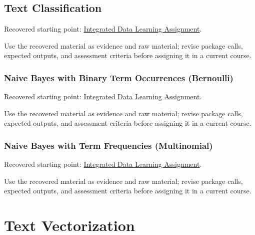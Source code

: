 \documentclass[
  letterpaper,
]{scrbook}
\begin{document}
\section*{Text Classification}\label{sec-pr-11-text-classification}


Recovered starting point:
\hyperref[sec-lab-integrated-learning-assignment]{Integrated Data
Learning Assignment}.

Use the recovered material as evidence and raw material; revise package
calls, expected outputs, and assessment criteria before assigning it in
a current course.

\subsection*{Naive Bayes with Binary Term Occurrences
(Bernoulli)}\label{sec-pr-11-naive-bayes-with-binary-term-occurrences-bernoulli}

Recovered starting point:
\hyperref[sec-lab-integrated-learning-assignment]{Integrated Data
Learning Assignment}.

Use the recovered material as evidence and raw material; revise package
calls, expected outputs, and assessment criteria before assigning it in
a current course.

\subsection*{Naive Bayes with Term Frequencies
(Multinomial)}\label{sec-pr-11-naive-bayes-with-term-frequencies-multinomial}

Recovered starting point:
\hyperref[sec-lab-integrated-learning-assignment]{Integrated Data
Learning Assignment}.

Use the recovered material as evidence and raw material; revise package
calls, expected outputs, and assessment criteria before assigning it in
a current course.

\chapter*{Text Vectorization}\label{ch-lab-text-vectorization}
\end{document}
